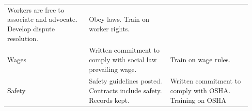 \documentclass[
      12pt,
        ]{article}
\begin{document}
\begin{longtable}[]{@{}lll@{}}
\begin{minipage}[t]{0.36\columnwidth}
Workers are free to associate and advocate. Develop dispute
resolution.\strut
\end{minipage} & \begin{minipage}[t]{0.36\columnwidth}\raggedright\strut
Obey laws. Train on worker rights.\strut
\end{minipage}\tabularnewline
\begin{minipage}[t]{0.20\columnwidth}\raggedright\strut
Wages\strut
\end{minipage} & \begin{minipage}[t]{0.36\columnwidth}\raggedright\strut
Written commitment to comply with social law prevailing wage.\strut
\end{minipage} & \begin{minipage}[t]{0.36\columnwidth}\raggedright\strut
Train on wage rules.\strut
\end{minipage}\tabularnewline
\begin{minipage}[t]{0.20\columnwidth}\raggedright\strut
Safety\strut
\end{minipage} & \begin{minipage}[t]{0.36\columnwidth}\raggedright\strut
Safety guidelines posted. Contracts include safety. Records kept.\strut
\end{minipage} & \begin{minipage}[t]{0.36\columnwidth}\raggedright\strut
Written commitment to comply with OSHA. Training on OSHA\strut
\end{minipage}\tabularnewline
\bottomrule
\end{longtable}
\newpage
\singlespacing 
\end{document}
